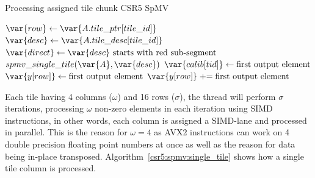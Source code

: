 \documentclass[thesis=M,english]{FITthesis}[2019/12/23]
\newcommand{\pluseq}{\mathrel{+}=}
\begin{document}
\begin{algorithm}[h]
    \caption{Processing assigned tile chunk CSR5 SpMV}\label{csr5:chunk}
    \begin{algorithmic}

        \State $\var{row} \gets \var{A.tile\_ptr[tile\_id]}$
        \State $\var{desc} \gets \var{A.tile\_desc[tile\_id]}$
        \State $\var{direct} \gets \var{desc}\text{ starts with red sub-segment}$
        \State $spmv\_single\_tile(\var{A}, \var{desc})$
        \State $\var{calib[tid]} \gets \text{first output element}$
        \Else
        \State $\var{y[row]} \gets \text{first output element}$
        \Else
        \State $\var{y[row]} \pluseq \text{first output element}$
        \EndIf
        \EndIf
        \EndFor
        \EndFunction
    \end{algorithmic}
\end{algorithm}

Each tile having 4 columns (\(\omega{}\)) and 16 rows (\(\sigma{}\)), the
thread will perform \(\sigma{}\) iterations,
processing \(\omega{}\) non-zero elements in each iteration using SIMD instructions, in other words,
each column is assigned a SIMD-lane and processed in parallel. This is the reason
for \(\omega{} = 4\) as AVX2 instructions can work on 4 double precision floating point numbers at once
as well as the reason for data being in-place transposed. Algorithm~\ref{csr5:spmv:single_tile} shows
how a single tile column is processed.
\end{document}
